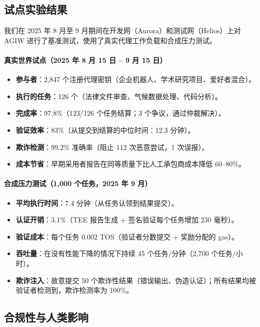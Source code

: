\documentclass[11pt]{article}
\begin{document}
\subsection{试点实验结果}
\label{sec:pilot-results}
我们在 2025 年 8 月至 9 月期间在开发网（Aurora）和测试网（Helios）上对 AGIW 进行了基准测试，使用了真实代理工作负载和合成压力测试。

\paragraph{真实世界试点（2025 年 8 月 15 日 -- 9 月 15 日）}
\begin{itemize}[noitemsep]
  \item \textbf{参与者}：2,847 个注册代理密钥（企业机器人、学术研究项目、爱好者混合）。
  \item \textbf{执行的任务}：126 个（法律文件审查、气候数据处理、代码分析）。
  \item \textbf{完成率}：97.8\%（123/126 个任务结算；3 个争议，通过仲裁解决）。
  \item \textbf{验证效率}：83\%（从提交到结算的中位时间：12.3 分钟）。
  \item \textbf{欺诈检测}：99.2\% 准确率（阻止 112 次恶意尝试，1 次误报）。
  \item \textbf{成本节省}：早期采用者报告在同等质量下比人工承包商成本降低 60--80\%。
\end{itemize}

\paragraph{合成压力测试（1,000 个任务，2025 年 9 月）}
\begin{itemize}[noitemsep]
  \item \textbf{平均执行时间}：7.4 分钟（从任务认领到结果提交）。
  \item \textbf{认证开销}：3.1\%（TEE 报告生成 + 签名验证每个任务增加 230 毫秒）。
  \item \textbf{验证成本}：每个任务 0.002 TOS（验证者分数提交 + 奖励分配的 gas）。
  \item \textbf{吞吐量}：在没有性能下降的情况下持续 45 个任务/分钟（2,700 个任务/小时）。
  \item \textbf{欺诈注入}：故意提交 50 个欺诈性结果（错误输出、伪造认证）；所有结果均被验证者检测到，欺诈检测率为 100\%。
\end{itemize}

\subsection{合规性与人类影响}
\end{document}
